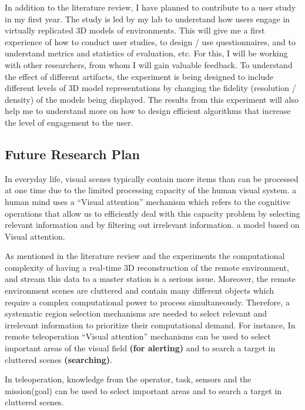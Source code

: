 In addition to the literature review, I have planned to contribute to a user study in my first year. The study is led by my lab to understand how users engage in virtually replicated 3D models of environments. This will give me a first experience of how to conduct user studies, to design / use questionnaires, and to understand metrics and statistics of evaluation, etc. For this, I will be working with other researchers, from whom I will gain valuable feedback. To understand the effect of different artifacts, the experiment is being designed to include different levels of 3D model representations by changing the fidelity (resolution / density) of the models being displayed. The results from this experiment will also help me to understand more on how to design efficient algorithms that increase the level of engagement to the user. 

\subsection*{Future Research Plan}

In everyday life, visual scenes typically contain more items than can be processed at one time due to the limited processing capacity of the human visual system. a human mind uses a  “Visual attention” mechanism which refers to the cognitive operations that allow us to efficiently deal with this capacity problem by selecting relevant information and by filtering out irrelevant information. a model based on Visual attention.  

As mentioned in the literature review and the experiments the computational complexity of having a real-time 3D reconstruction of the remote environment, and stream this data to a master station is a serious issue. Moreover, the remote environment scenes are cluttered and contain many different objects which require a complex computational power to process simultaneously. Therefore, a systematic region selection mechanisms are needed to select relevant and irrelevant information to prioritize their computational demand. For instance, In remote teleoperation “Visual attention” mechanisms can be used to select important areas of the visual field \textbf{(for alerting)} and to search a target in cluttered scenes \textbf{(searching)}.


In teleoperation, knowledge from the operator, task, sensors and the mission(goal) can be used to select important areas and to search a target in cluttered scenes.

